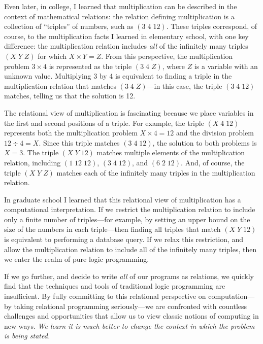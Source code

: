 

Even later, in college, I learned that multiplication can be
described in the context of mathematical relations: the relation
defining multiplication is a collection of ``triples'' of numbers,
such as \mbox{$(3\; 4\; 12)$}.
%
These triples correspond, of course, to the multiplication facts I
learned in elementary school, with one key difference: the
multiplication relation includes \emph{all} of the infinitely many
triples \mbox{$(X\; Y\; Z)$} for which \mbox{$X \times Y = Z$}.
%
From this perspective, the multiplication problem \mbox{$3 \times 4$}
is represented as the triple \mbox{$(3\; 4\; Z)$}, where $Z$ is a
variable with an unknown value.
%
Multiplying 3 by 4 is equivalent to finding a triple in the
multiplication relation that matches \mbox{$(3\; 4\; Z)$}---in this
case, the triple \mbox{$(3\; 4\; 12)$} matches, telling us that the
solution is 12.

The relational view of multiplication is fascinating because we place
variables in the first and second positions of a triple.
%
For example, the triple \mbox{$(X\; 4\; 12)$} represents both the
multiplication problem \mbox{$X \times 4 = 12$} and the division
problem \mbox{$12 \div 4 = X$}.
%
Since this triple matches \mbox{$(3\; 4\; 12)$}, the solution to both
problems is $X = 3$.
%
The triple \mbox{$(X\; Y\; 12)$} matches multiple elements of the
multiplication relation, including \mbox{$(1\; 12\; 12)$},
\mbox{$(3\; 4\; 12)$}, and \mbox{$(6\; 2\; 12)$}.
%
And, of course, the triple \mbox{$(X\; Y\; Z)$} matches each of the
infinitely many triples in the multiplication relation.


In graduate school I learned that this relational view of
multiplication has a computational interpretation.
%
If we restrict the multiplication relation to include only a finite
number of triples---for example, by setting an upper bound on the size
of the numbers in each triple---then finding all triples that match
\mbox{$(X\; Y\; 12)$} is equivalent to performing a database query.
%
If we relax this restriction, and allow the multiplication relation to
include all of the infinitely many triples, then we enter the realm of
pure logic programming.

If we go further, and decide to write \emph{all} of our programs as
relations, we quickly find that the techniques and tools of
traditional logic programming are insufficient.
%
By fully committing to this relational perspective on computation---by
taking relational programming seriously---we are confronted with
countless challenges and opportunities that allow us to view classic
notions of computing in new ways.
%
\emph{We learn it is much better to change the context in which the problem is being stated.}





